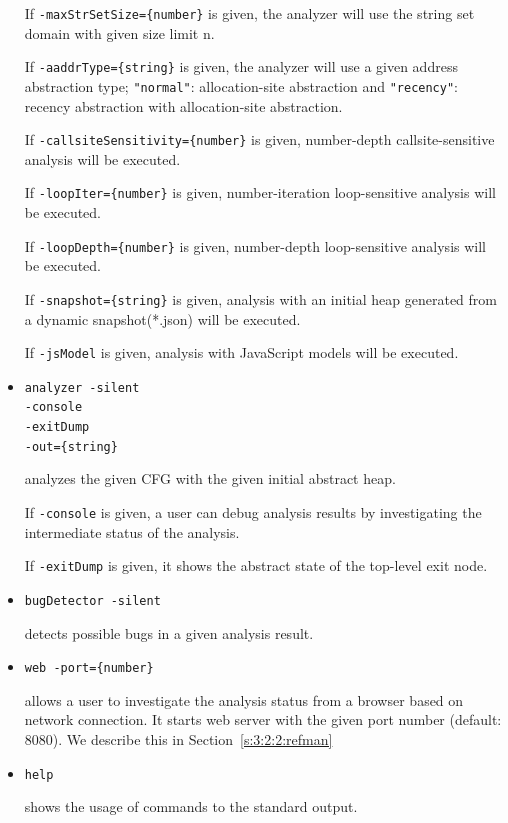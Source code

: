 \begin{itemize}
If \verb!-maxStrSetSize={number}! is given,
the analyzer will use the string set domain with given size limit n.

If \verb!-aaddrType={string}! is given,
the analyzer will use a given address abstraction type;
\verb!"normal"!: allocation-site abstraction and
\verb!"recency"!: recency abstraction with allocation-site abstraction.

If \verb!-callsiteSensitivity={number}! is given,
{number}-depth callsite-sensitive analysis will be executed.

If \verb!-loopIter={number}! is given,
{number}-iteration loop-sensitive analysis will be executed.

If \verb!-loopDepth={number}! is given,
{number}-depth loop-sensitive analysis will be executed.

If \verb!-snapshot={string}! is given,
analysis with an initial heap generated from a dynamic snapshot(*.json)
will be executed.

If \verb!-jsModel! is given,
analysis with JavaScript models will be executed.

\item \verb!analyzer -silent!\\
\hspace*{4.7em}\verb!-console!\\
\hspace*{4.7em}\verb!-exitDump!\\
\hspace*{4.7em}\verb!-out={string}!

analyzes the given CFG with the given initial abstract heap.

If \verb!-console! is given,
a user can debug analysis results by investigating the intermediate
status of the analysis.

If \verb!-exitDump! is given,
it shows the abstract state of the top-level exit node.

\item \verb!bugDetector -silent!

detects possible bugs in a given analysis result.

\item \verb!web -port={number}!

allows a user to investigate the analysis status from a browser
based on network connection. It starts web server with the given
port number (default: 8080). We describe this in Section~\ref{s:3:2:2:refman}

\item \verb!help!

shows the usage of \safe commands to the standard output.
\end{itemize}

